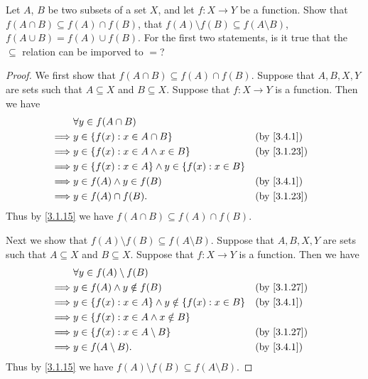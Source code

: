 \begin{ex}\label{ex:3.4.3}
  Let \(A\), \(B\) be two subsets of a set \(X\), and let \(f : X \to Y\) be a function.
  Show that \(f(A \cap B) \subseteq f(A) \cap f(B)\), that \(f(A) \setminus f(B) \subseteq f(A \setminus B)\), \(f(A \cup B) = f(A) \cup f(B)\).
  For the first two statements, is it true that the \(\subseteq\) relation can be imporved to \(=\)?
\end{ex}

\begin{proof}
  We first show that \(f(A \cap B) \subseteq f(A) \cap f(B)\).
  Suppose that \(A, B, X, Y\) are sets such that \(A \subseteq X\) and \(B \subseteq X\).
  Suppose that \(f : X \to Y\) is a function.
  Then we have
  \begin{align*}
             & \forall y \in f(A \cap B)                                                \\
    \implies & y \in \{f(x) : x \in A \cap B\}                         &  & \by{3.4.1}  \\
    \implies & y \in \{f(x) : x \in A \land x \in B\}                  &  & \by{3.1.23} \\
    \implies & y \in \{f(x) : x \in A\} \land y \in \{f(x) : x \in B\}                  \\
    \implies & y \in f(A) \land y \in f(B)                             &  & \by{3.4.1}  \\
    \implies & y \in f(A) \cap f(B).                                   &  & \by{3.1.23}
  \end{align*}
  Thus by \cref{3.1.15} we have \(f(A \cap B) \subseteq f(A) \cap f(B)\).

  Next we show that \(f(A) \setminus f(B) \subseteq f(A \setminus B)\).
  Suppose that \(A, B, X, Y\) are sets such that \(A \subseteq X\) and \(B \subseteq X\).
  Suppose that \(f : X \to Y\) is a function.
  Then we have
  \begin{align*}
             & \forall y \in f(A) \setminus f(B)                                           \\
    \implies & y \in f(A) \land y \notin f(B)                             &  & \by{3.1.27} \\
    \implies & y \in \{f(x) : x \in A\} \land y \notin \{f(x) : x \in B\} &  & \by{3.4.1}  \\
    \implies & y \in \{f(x) : x \in A \land x \notin B\}                                   \\
    \implies & y \in \{f(x) : x \in A \setminus B\}                       &  & \by{3.1.27} \\
    \implies & y \in f(A \setminus B).                                    &  & \by{3.4.1}
  \end{align*}
  Thus by \cref{3.1.15} we have \(f(A) \setminus f(B) \subseteq f(A \setminus B)\).


\end{proof}
